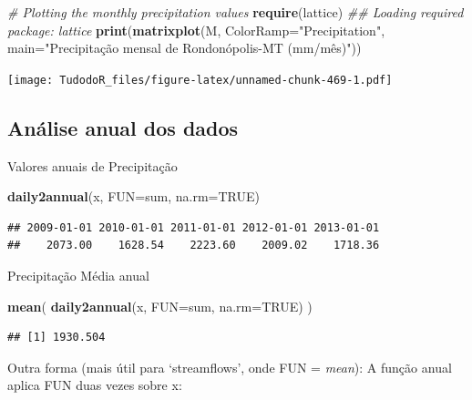 \documentclass[
]{book}
\newenvironment{Shaded}{\begin{snugshade}}{\end{snugshade}}
\newcommand{\CommentTok}[1]{\textcolor[rgb]{0.56,0.35,0.01}{\textit{#1}}}
\newcommand{\DataTypeTok}[1]{\textcolor[rgb]{0.13,0.29,0.53}{#1}}
\newcommand{\KeywordTok}[1]{\textcolor[rgb]{0.13,0.29,0.53}{\textbf{#1}}}
\newcommand{\NormalTok}[1]{#1}
\newcommand{\OtherTok}[1]{\textcolor[rgb]{0.56,0.35,0.01}{#1}}
\newcommand{\StringTok}[1]{\textcolor[rgb]{0.31,0.60,0.02}{#1}}
\begin{document}
\begin{Shaded}
\begin{Highlighting}[]
\CommentTok{# Plotting the monthly precipitation values}
\KeywordTok{require}\NormalTok{(lattice)}
\CommentTok{## Loading required package: lattice}
\KeywordTok{print}\NormalTok{(}\KeywordTok{matrixplot}\NormalTok{(M, }\DataTypeTok{ColorRamp=}\StringTok{"Precipitation"}\NormalTok{,}
\DataTypeTok{main=}\StringTok{"Precipitação mensal de Rondonópolis-MT (mm/mês)"}\NormalTok{))}
\end{Highlighting}
\end{Shaded}

\texttt{[image: TudodoR\_files/figure-latex/unnamed-chunk-469-1.pdf]}

\hypertarget{anuxe1lise-anual-dos-dados}{%
\subsection{Análise anual dos dados}\label{anuxe1lise-anual-dos-dados}}

Valores anuais de Precipitação

\begin{Shaded}
\begin{Highlighting}[]
\KeywordTok{daily2annual}\NormalTok{(x, }\DataTypeTok{FUN=}\NormalTok{sum, }\DataTypeTok{na.rm=}\OtherTok{TRUE}\NormalTok{)}
\end{Highlighting}
\end{Shaded}

\begin{verbatim}
## 2009-01-01 2010-01-01 2011-01-01 2012-01-01 2013-01-01 
##    2073.00    1628.54    2223.60    2009.02    1718.36
\end{verbatim}

Precipitação Média anual

\begin{Shaded}
\begin{Highlighting}[]
\KeywordTok{mean}\NormalTok{( }\KeywordTok{daily2annual}\NormalTok{(x, }\DataTypeTok{FUN=}\NormalTok{sum, }\DataTypeTok{na.rm=}\OtherTok{TRUE}\NormalTok{) )}
\end{Highlighting}
\end{Shaded}

\begin{verbatim}
## [1] 1930.504
\end{verbatim}

Outra forma (mais útil para `streamflows', onde FUN = \emph{mean}): A função anual aplica FUN duas vezes sobre x:
\end{document}
